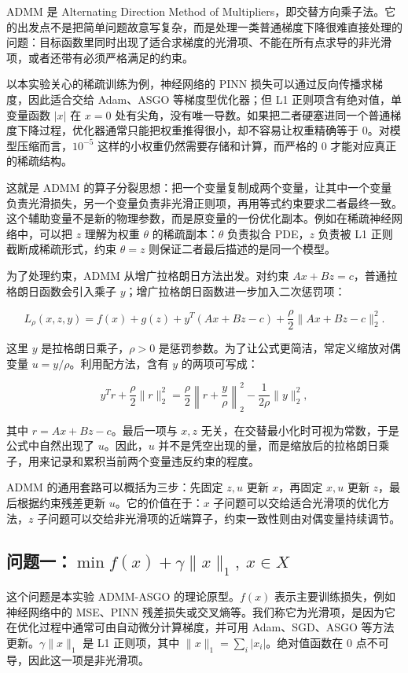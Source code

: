\documentclass[UTF8,a4paper,12pt,fontset=none]{ctexart}
\begin{document}
ADMM 是 Alternating Direction Method of Multipliers，即交替方向乘子法。它的出发点不是把简单问题故意写复杂，而是处理一类普通梯度下降很难直接处理的问题：目标函数里同时出现了适合求梯度的光滑项、不能在所有点求导的非光滑项，或者还带有必须严格满足的约束。

以本实验关心的稀疏训练为例，神经网络的 PINN 损失可以通过反向传播求梯度，因此适合交给 Adam、ASGO 等梯度型优化器；但 L1 正则项含有绝对值，单变量函数 $|x|$ 在 $x=0$ 处有尖角，没有唯一导数。如果把二者硬塞进同一个普通梯度下降过程，优化器通常只能把权重推得很小，却不容易让权重精确等于 0。对模型压缩而言，$10^{-5}$ 这样的小权重仍然需要存储和计算，而严格的 0 才能对应真正的稀疏结构。

这就是 ADMM 的算子分裂思想：把一个变量复制成两个变量，让其中一个变量负责光滑损失，另一个变量负责非光滑正则项，再用等式约束要求二者最终一致。这个辅助变量不是新的物理参数，而是原变量的一份优化副本。例如在稀疏神经网络中，可以把 $z$ 理解为权重 $\theta$ 的稀疏副本：$\theta$ 负责拟合 PDE，$z$ 负责被 L1 正则截断成稀疏形式，约束 $\theta=z$ 则保证二者最后描述的是同一个模型。

为了处理约束，ADMM 从增广拉格朗日方法出发。对约束 $Ax+Bz=c$，普通拉格朗日函数会引入乘子 $y$；增广拉格朗日函数进一步加入二次惩罚项：

\[
L_\rho(x,z,y)=f(x)+g(z)+y^T(Ax+Bz-c)+\frac{\rho}{2}\|Ax+Bz-c\|_2^2.
\]

这里 $y$ 是拉格朗日乘子，$\rho>0$ 是惩罚参数。为了让公式更简洁，常定义缩放对偶变量 $u=y/\rho$。利用配方法，含有 $y$ 的两项可写成：

\[
y^Tr+\frac{\rho}{2}\|r\|_2^2=\frac{\rho}{2}\left\|r+\frac{y}{\rho}\right\|_2^2-\frac{1}{2\rho}\|y\|_2^2,
\]

其中 $r=Ax+Bz-c$。最后一项与 $x,z$ 无关，在交替最小化时可视为常数，于是公式中自然出现了 $u$。因此，$u$ 并不是凭空出现的量，而是缩放后的拉格朗日乘子，用来记录和累积当前两个变量违反约束的程度。

ADMM 的通用套路可以概括为三步：先固定 $z,u$ 更新 $x$，再固定 $x,u$ 更新 $z$，最后根据约束残差更新 $u$。它的价值在于：$x$ 子问题可以交给适合光滑项的优化方法，$z$ 子问题可以交给非光滑项的近端算子，约束一致性则由对偶变量持续调节。

\subsection{问题一：$\min f(x)+\gamma\|x\|_1,\ x\in X$}

这个问题是本实验 ADMM-ASGO 的理论原型。$f(x)$ 表示主要训练损失，例如神经网络中的 MSE、PINN 残差损失或交叉熵等。我们称它为光滑项，是因为它在优化过程中通常可由自动微分计算梯度，并可用 Adam、SGD、ASGO 等方法更新。$\gamma\|x\|_1$ 是 L1 正则项，其中 $\|x\|_1=\sum_i |x_i|$。绝对值函数在 0 点不可导，因此这一项是非光滑项。
\end{document}
